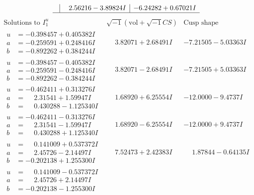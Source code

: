 \documentclass[1p]{elsarticle_modified}
\theoremstyle{definition}
\newcommand{\I}{\sqrt{-1}}
\begin{document}
$$\begin{array}{c|c|c}
 & \phantom{-}2.56216 - 3.89824 I & -6.24282 + 0.67021 I\\
 \hline 
 \end{array}$$\newpage$$\begin{array}{c|c|c}  
\text{Solutions to }I^u_{1}& \I (\text{vol} + \sqrt{-1}CS) & \text{Cusp shape}\\
 \hline 
\begin{aligned}
u &= -0.398457 + 0.405382 I \\
a &= -0.259591 + 0.248416 I \\
b &= -0.892262 + 0.384244 I\end{aligned}
 & \phantom{-}3.82071 + 2.68491 I & -7.21505 - 5.03363 I \\ \hline\begin{aligned}
u &= -0.398457 - 0.405382 I \\
a &= -0.259591 - 0.248416 I \\
b &= -0.892262 - 0.384244 I\end{aligned}
 & \phantom{-}3.82071 - 2.68491 I & -7.21505 + 5.03363 I \\ \hline\begin{aligned}
u &= -0.462411 + 0.313276 I \\
a &= \phantom{-}2.31541 + 1.59947 I \\
b &= \phantom{-}0.430288 - 1.125340 I\end{aligned}
 & \phantom{-}1.68920 + 6.25554 I & -12.0000 - 9.4737 I \\ \hline\begin{aligned}
u &= -0.462411 - 0.313276 I \\
a &= \phantom{-}2.31541 - 1.59947 I \\
b &= \phantom{-}0.430288 + 1.125340 I\end{aligned}
 & \phantom{-}1.68920 - 6.25554 I & -12.0000 + 9.4737 I \\ \hline\begin{aligned}
u &= \phantom{-}0.141009 + 0.537372 I \\
a &= \phantom{-}2.45726 - 2.14497 I \\
b &= -0.202138 + 1.255300 I\end{aligned}
 & \phantom{-}7.52473 + 2.42383 I & \phantom{-}1.87844 - 0.64135 I \\ \hline\begin{aligned}
u &= \phantom{-}0.141009 - 0.537372 I \\
a &= \phantom{-}2.45726 + 2.14497 I \\
b &= -0.202138 - 1.255300 I\end{aligned}

\end{array}$$
\end{document}
